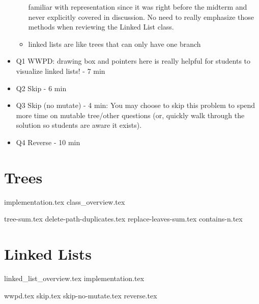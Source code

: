 \documentclass{exam}
\begin{document}
\begin{guide}
\begin{itemize}
\begin{itemize}
        familiar with representation since it was right before the midterm and never explicitly covered in discussion. No need to  
        really emphasize those methods when reviewing the Linked List class.
        \item linked lists are like trees that can only have one branch
    \end{itemize}
    \item Q1 WWPD: drawing box and pointers here is really helpful for students to visualize linked lists! - 7 min
    \item Q2 Skip - 6 min
    \item Q3 Skip (no mutate) - 4 min: You may choose to skip this problem to spend more time on mutable tree/other questions
     (or, quickly walk through the solution so students are aware it exists).
    \item Q4 Reverse - 10 min
\end{itemize}
\end{guide}

\newpage
\section{Trees}
{implementation.tex}
{class_overview.tex}
\begin{questions}
    {tree-sum.tex}
    \newpage
    {delete-path-duplicates.tex}
    \newpage
    {replace-leaves-sum.tex}
    {contains-n.tex}
\end{questions}

\section{Linked Lists}
{linked_list_overview.tex}
{implementation.tex}
\newpage
\begin{questions}
{wwpd.tex}
\newpage
{skip.tex}
{skip-no-mutate.tex}
{reverse.tex}
\end{questions}
\end{document}
